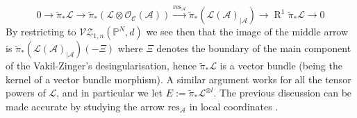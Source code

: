 \documentclass[11pt]{amsart}
\newcommand{\VZ}[3]{\mathcal{V\!Z}_{1,#1}(#2,#3)}
\newcommand{\PP}{\mathbb P}
\newcommand{\OO}{\mathcal{O}}
\renewcommand{\to}{\rightarrow}
\theoremstyle{definition}
\theoremstyle{definition}
\begin{document}
\[0\to \tilde\pi_*\mathcal L\to \tilde\pi_*(\mathcal L\otimes \OO_{\mathcal C}(\mathcal A))\xrightarrow{\mathrm{res}_{\mathcal A}} \tilde\pi_*(\mathcal L(\mathcal A)_{|\mathcal A})\to \operatorname{R}^1\tilde\pi_*\mathcal L\to 0\]
By restricting to $\VZ{n}{\PP^N}{d}$ we see then that the image of the middle arrow is $\tilde\pi_*(\mathcal L(\mathcal A)_{|\mathcal A})(-\Xi)$ where $\Xi$ denotes the boundary of the main component of the Vakil-Zinger's desingularisation, hence $\tilde\pi_*\mathcal L$ is a vector bundle (being the kernel of a vector bundle morphism). A similar argument works for all the tensor powers of $\mathcal L$, and in particular we let $E:=\tilde\pi_*\mathcal L^{\otimes l}$. The previous discussion can be made accurate by studying the arrow $\mathrm{res}_{\mathcal A}$ in local coordinates \cite[Proposition 4.13]{HL}.
\end{document}
